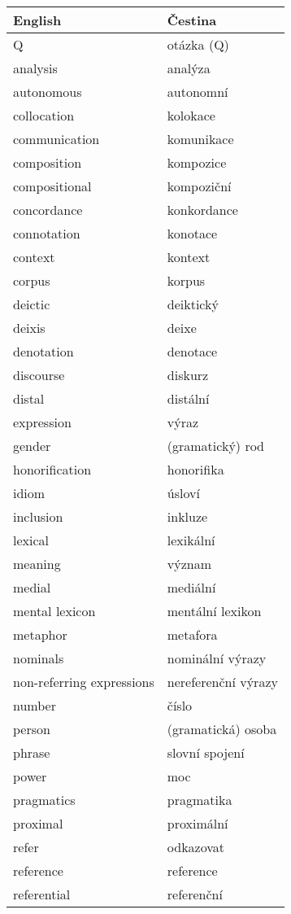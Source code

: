 \documentclass[a4paper,landscape,headrule,footrule,xetex,25pt]{foils}
\begin{document}
\begin{flushleft}
\begin{longtable}{ll}
  English & Čestina \\\hline \endhead
Q & otázka (Q) \\
analysis & analýza \\
autonomous & autonomní \\
collocation & kolokace \\
communication & komunikace \\
composition & kompozice \\
compositional & kompoziční \\
concordance & konkordance \\
connotation & konotace \\
context & kontext \\
corpus & korpus \\
deictic & deiktický \\
deixis & deixe \\
denotation & denotace \\
discourse & diskurz \\
distal & distální \\
expression & výraz \\
gender &  (gramatický) rod \\
honorification & honorifika \\
idiom & úsloví \\
inclusion & inkluze \\
lexical & lexikální \\
meaning & význam \\
medial & mediální \\
mental lexicon & mentální lexikon \\
metaphor & metafora \\
nominals & nominální výrazy \\
non-referring expressions & nereferenční výrazy \\
number & číslo \\
person & (gramatická) osoba \\
phrase & slovní spojení \\
power & moc \\
pragmatics & pragmatika \\
proximal & proximální \\
refer & odkazovat \\
reference & reference \\
referential & referenční \\

\end{longtable}
\end{flushleft}
\end{document}

